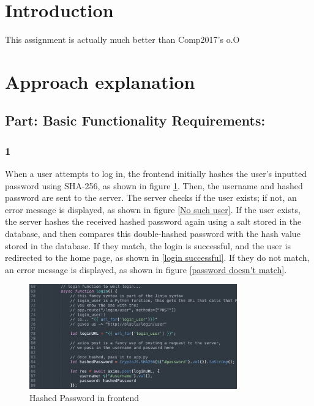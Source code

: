 \documentclass[12pt]{article}
\begin{document}
\section{Introduction}

This assignment is actually much better than Comp2017's o.O

\section{Approach explanation}
    \subsection*{Part: Basic Functionality Requirements:}
        \subsubsection*{1} When a user attempts to log in, the frontend initially hashes the user's inputted password using SHA-256, as shown in figure \ref{Hashed Password in frontend}. Then, the username and hashed password are sent to the server. The server checks if the user exists; if not, an error message is displayed, as shown in figure \ref{No such user}. If the user exists, the server hashes the received hashed password again using a salt stored in the database, and then compares this double-hashed password with the hash value stored in the database. If they match, the login is successful, and the user is redirected to the home page, as shown in \ref{login successful}. If they do not match, an error message is displayed, as shown in figure \ref{password doesn't match}.

        \begin{figure}[H]
            \centering
            \includegraphics[width=0.8\textwidth]{graphs/front_login_hashed.jpg}
            \caption{Hashed Password in frontend}
            \label{Hashed Password in frontend}
        \end{figure}
\end{document}
